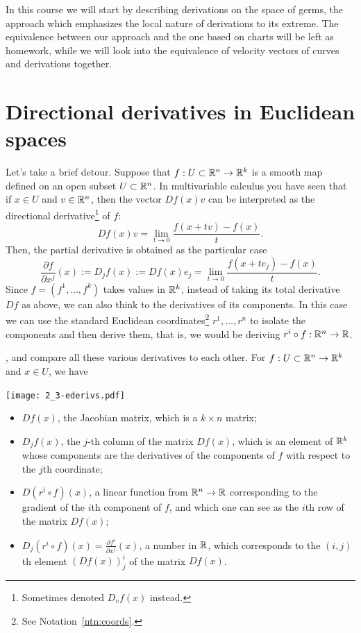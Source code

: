 In this course we will start by describing derivations on the space of germs, the approach which emphasizes the local nature of derivations to its extreme.
The equivalence between our approach and the one based on charts will be left as homework, while we will look into the equivalence of velocity vectors of curves and derivations together.

\section{Directional derivatives in Euclidean spaces}\label{sec:dd}

Let's take a brief detour.
Suppose that $f: U\subset\mathbb{R}^n\to\mathbb{R}^k$ is a smooth map defined on an open subset $U\subset \mathbb{R}^n$.
In multivariable calculus you have seen that if $x\in U$ and $v\in\mathbb{R}^n$, then the vector $Df(x) v$ can be interpreted as the directional derivative\footnote{Sometimes denoted $D_v f(x)$ instead.} of $f$:
\begin{equation}
	Df(x) v = \lim_{t\to0}\frac{f(x+tv) - f(x)}{t}.
\end{equation}
Then, the partial derivative is obtained as the particular case
\begin{equation}
	\frac{\partial f}{\partial x^j}(x) := D_jf(x) := Df(x) e_j = \lim_{t\to0} \frac{f(x+te_j) - f(x)}{t}.
\end{equation}
Since $f=(f^1, \ldots, f^k)$ takes values in $\mathbb{R}^k$, instead of taking its total derivative $Df$ as above, we can also think to the derivatives of its components.
In this case we can use the standard Euclidean coordinates\footnote{See Notation~\ref{ntn:coords}.} $r^1, \ldots, r^n$ to isolate the components and then derive them, that is, we would be deriving $r^i \circ f : \mathbb{R}^n \to \mathbb{R}$.

, and compare all these various derivatives to each other.
For $f:U\subset\mathbb{R}^n\to\mathbb{R}^k$ and $x\in U$, we have
\begin{marginfigure}[3.5cm]
	\texttt{[image: 2\_3-ederivs.pdf]}
\end{marginfigure}
\begin{itemize}
	\item $Df(x)$, the Jacobian matrix, which is a $k\times n$ matrix;
	\item $D_j f(x)$, the $j$-th column of the matrix $Df(x)$, which is an element of $\mathbb{R}^k$ whose components are the derivatives of the components of $f$ with respect to the $j$th coordinate;
	\item $D(r^i\circ f)(x)$, a linear function from $\mathbb{R}^n \to \mathbb{R}$ corresponding to the gradient of the $i$th component of $f$, and which one can see as the $i$th row of the matrix $Df(x)$;
	\item $D_j(r^i\circ f)(x) = \frac{\partial f^i}{\partial x^j}(x)$, a number in $\mathbb{R}$, which corresponds to the $(i,j)$th element $(Df(x))_j^i$ of the matrix $Df(x)$.
\end{itemize}

